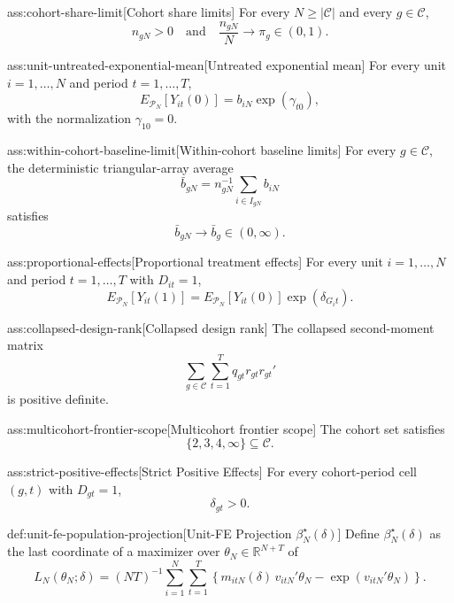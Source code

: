 \begin{assumptionv}{ass:cohort-share-limit}[Cohort share limits]
For every \(N\ge |\mathcal C|\) and every \(g\in\mathcal C\),
\[
n_{gN}>0
\quad\text{and}\quad
\frac{n_{gN}}{N}\to \pi_g\in(0,1).
\]
\end{assumptionv}

\begin{assumptionv}{ass:unit-untreated-exponential-mean}[Untreated exponential mean]
For every unit \(i=1,\ldots,N\) and period \(t=1,\ldots,T\),
\[
E_{\mathcal P_N}\!\left[Y_{it}(0)\right]
=
b_{iN}\exp(\gamma_{t0}),
\]
with the normalization \(\gamma_{10}=0\).
\end{assumptionv}

\begin{assumptionv}{ass:within-cohort-baseline-limit}[Within-cohort baseline limits]
For every \(g\in\mathcal C\), the deterministic triangular-array average
\[
\bar b_{gN}
=
n_{gN}^{-1}\sum_{i\in I_{gN}} b_{iN}
\]
satisfies
\[
\bar b_{gN}\to \bar b_g\in(0,\infty).
\]
\end{assumptionv}

\begin{assumptionv}{ass:proportional-effects}[Proportional treatment effects]
For every unit \(i=1,\ldots,N\) and period \(t=1,\ldots,T\) with \(D_{it}=1\),
\[
E_{\mathcal P_N}\!\left[Y_{it}(1)\right]
=
E_{\mathcal P_N}\!\left[Y_{it}(0)\right]\exp(\delta_{G_i t}).
\]
\end{assumptionv}

\begin{assumptionv}{ass:collapsed-design-rank}[Collapsed design rank]
The collapsed second-moment matrix
\[
\sum_{g\in\mathcal C}\sum_{t=1}^T q_{gt} r_{gt} r_{gt}'
\]
is positive definite.
\end{assumptionv}

\begin{assumptionv}{ass:multicohort-frontier-scope}[Multicohort frontier scope]
The cohort set satisfies
\[
\{2,3,4,\infty\}\subseteq \mathcal C.
\]
\end{assumptionv}

\begin{assumptionv}{ass:strict-positive-effects}[Strict Positive Effects]
For every cohort-period cell \((g,t)\) with \(D_{gt}=1\),
\[
\delta_{gt}>0.
\]
\end{assumptionv}

\begin{definitionv}{def:unit-fe-population-projection}[Unit-FE Projection \(\beta_N^\star(\delta)\)]
Define \(\beta_N^\star(\delta)\) as the last coordinate of a maximizer over \(\theta_N\in\mathbb R^{N+T}\) of
\[
L_N(\theta_N;\delta)
=
(NT)^{-1}\sum_{i=1}^N\sum_{t=1}^T
\left\{
m_{itN}(\delta)\,v_{itN}'\theta_N-\exp(v_{itN}'\theta_N)
\right\}.
\]
\end{definitionv}

